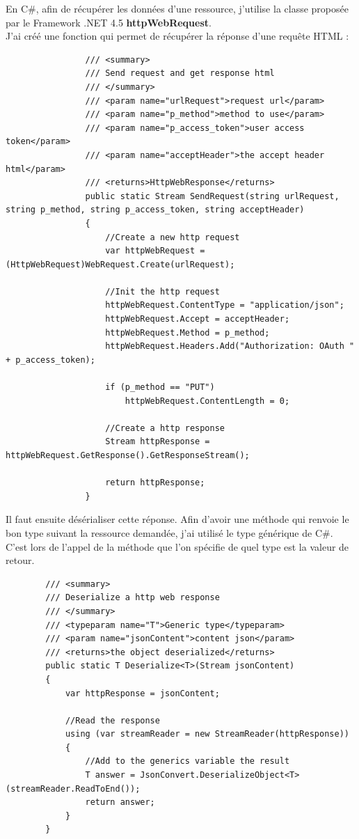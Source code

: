 \documentclass[11pt]{report} %
\begin{document}
		En C\#, afin de récupérer les données d'une ressource, j'utilise la classe proposée par le Framework .NET 4.5 \textbf{httpWebRequest}.\\		
		J'ai créé une fonction qui permet de récupérer la réponse d'une requête HTML :
		
		\begin{lstlisting}
		        /// <summary>
		        /// Send request and get response html
		        /// </summary>
		        /// <param name="urlRequest">request url</param>
		        /// <param name="p_method">method to use</param>
		        /// <param name="p_access_token">user access token</param>
		        /// <param name="acceptHeader">the accept header html</param>
		        /// <returns>HttpWebResponse</returns>
		        public static Stream SendRequest(string urlRequest, string p_method, string p_access_token, string acceptHeader)
		        {
			        //Create a new http request
			        var httpWebRequest = (HttpWebRequest)WebRequest.Create(urlRequest);
			        
			        //Init the http request
			        httpWebRequest.ContentType = "application/json";
			        httpWebRequest.Accept = acceptHeader;
			        httpWebRequest.Method = p_method;
			        httpWebRequest.Headers.Add("Authorization: OAuth " + p_access_token);
			        
			        if (p_method == "PUT")
				        httpWebRequest.ContentLength = 0;
			        
			        //Create a http response
			        Stream httpResponse = httpWebRequest.GetResponse().GetResponseStream();
			        
			        return httpResponse;
		        }
		\end{lstlisting}
		
		Il faut ensuite désérialiser cette réponse. Afin d’avoir une méthode qui renvoie le bon type suivant la ressource demandée, j’ai utilisé le type générique de C\#. C'est lors de l'appel de la méthode que l'on spécifie de quel type est la valeur de retour.
		
		\begin{lstlisting}
		/// <summary>
		/// Deserialize a http web response
		/// </summary>
		/// <typeparam name="T">Generic type</typeparam>
		/// <param name="jsonContent">content json</param>
		/// <returns>the object deserialized</returns>
		public static T Deserialize<T>(Stream jsonContent)
		{
			var httpResponse = jsonContent;
			
			//Read the response
			using (var streamReader = new StreamReader(httpResponse))
			{
				//Add to the generics variable the result
				T answer = JsonConvert.DeserializeObject<T>(streamReader.ReadToEnd());
				return answer;
			}
		}
		\end{lstlisting}
		
\end{document}
